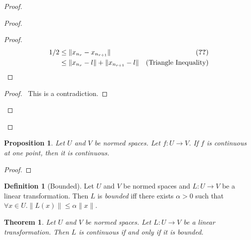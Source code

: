 \documentclass{book}
\let\qed\relax
\newtheorem{prop}[ax]{Proposition}
\newtheorem{thm}[ax]{Theorem}
\theoremstyle{definition}
\newtheorem{df}[ax]{Definition}
\begin{document}
\begin{proof}
\begin{proof}
	\begin{proof}
		\pf
		\begin{align*}
			1/2 & \leq \| x_{n_r} - x_{n_{r+1}} \| & (\text{\stepref{b}}) \\
			& \leq \| x_{n_r} - l \| + \| x_{n_{r+1}} - l \| & (\text{Triangle Inequality})
		\end{align*}
	\end{proof}
	\qedstep
	\begin{proof}
		\pf\ This is a contradiction.
	\end{proof}
\end{proof}
\qed
\end{proof}

\begin{prop}
\label{prop:continuous_at_one_point}
Let $U$ and $V$ be normed spaces. Let $f : U \rightarrow V$. If $f$ is continuous at one point, then it is continuous.
\end{prop}

\begin{proof}
\pf
{}
\qed
\end{proof}

\begin{df}[Bounded]
Let $U$ and $V$ be normed spaces and $L : U \rightarrow V$ be a linear transformation. Then $L$ is \emph{bounded} iff there exists $\alpha > 0$ such that $\forall x \in U. \| L(x) \| \leq \alpha \| x \|$.
\end{df}

\begin{thm}
Let $U$ and $V$ be normed spaces. Let $L : U \rightarrow V$ be a linear transformation. Then $L$ is continuous if and only if it is bounded.
\end{thm}
\end{document}
